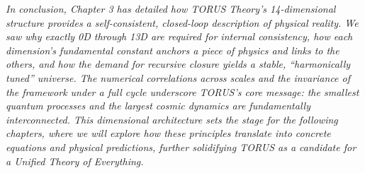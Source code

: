 \documentclass[
]{article}
\begin{document}
\emph{In conclusion, Chapter 3 has detailed how TORUS Theory's
14-dimensional structure provides a self-consistent, closed-loop
description of physical reality. We saw why exactly 0D through 13D are
required for internal consistency, how each dimension's fundamental
constant anchors a piece of physics and links to the others, and how the
demand for recursive closure yields a stable, ``harmonically tuned''
universe. The numerical correlations across scales and the invariance of
the framework under a full cycle underscore TORUS's core message: the
smallest quantum processes and the largest cosmic dynamics are
fundamentally interconnected. This dimensional architecture sets the
stage for the following chapters, where we will explore how these
principles translate into concrete equations and physical predictions,
further solidifying TORUS as a candidate for a Unified Theory of
Everything.}
\end{document}
